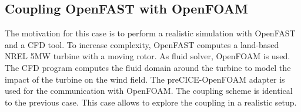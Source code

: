 \subsection{Coupling OpenFAST with OpenFOAM}
\label{section:cases:foam}

The motivation for this case is to perform a realistic simulation with OpenFAST and a CFD tool. To increase complexity, OpenFAST computes a land-based NREL 5MW turbine with a moving rotor. As fluid solver, OpenFOAM is used. The CFD program computes the fluid domain around the turbine to model the impact of the turbine on the wind field. The preCICE-OpenFOAM adapter is used for the communication with OpenFOAM. The coupling scheme is identical to the previous case. This case allows to explore the coupling in a realistic setup.

